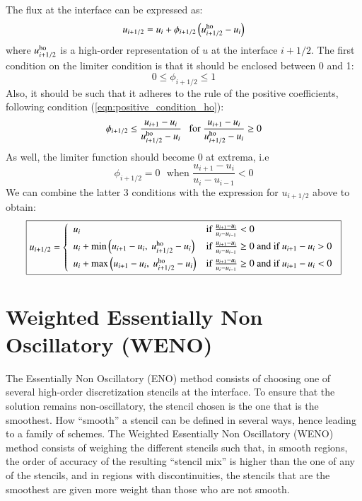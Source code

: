 \documentclass{warpdoc}
\newcommand{\alb}{\vspace{0.1cm}\\} %
\newcommand\frameeqn[1]{\fbox{$\displaystyle #1$}}
\begin{document}
The flux at the interface can be expressed as:
%
\begin{equation}
u_{i+1/2} = u_i +  \phi_{i+1/2} \left( u_{i+1/2}^{\rm ho} - u_i \right)
\end{equation}
% 
where $u_{i+1/2}^{\rm ho}$ is a high-order representation of $u$ at the interface $i+1/2$. 
The first condition on the limiter condition is that it should be enclosed between 0 and 1:
%
\begin{equation}
  0 \le \phi_{i+1/2} \le 1
\end{equation}
%
Also, it should be such that it adheres to the rule of the positive coefficients, following condition (\ref{eqn:positive_condition_ho}):
%
\begin{equation}
 \phi_{i+1/2} \le \frac{u_{i+1} - u_{i}}{u_{i+1/2}^{\rm ho} - u_{i}} ~~~{\rm for~}\frac{u_{i+1} - u_{i}}{u_{i+1/2}^{\rm ho} - u_{i}}\ge 0
\end{equation}
%
As well, the limiter function should become 0 at extrema, i.e
%
\begin{equation}
\phi_{i+1/2}=0 ~~~\textrm{when~}\frac{u_{i+1}-u_i}{u_i-u_{i-1}}<0
\end{equation}
%
We can combine the latter 3 conditions with the expression for $u_{i+1/2}$ above to obtain:
%
\begin{equation}
\frameeqn{
 u_{i+1/2}=\left\{ 
\begin{array}{ll} 
u_i & \textrm{if~}\frac{u_{i+1}-u_i}{u_i-u_{i-1}}<0\alb
u_i+\min\left(u_{i+1}-u_i,~u_{i+1/2}^{\rm ho}-u_i\right) & \textrm{if~}\frac{u_{i+1}-u_i}{u_i-u_{i-1}}\ge 0\textrm{~and~if~}u_{i+1}-u_i>0\alb
u_i+\max\left(u_{i+1}-u_i,~u_{i+1/2}^{\rm ho}-u_i\right) & \textrm{if~}\frac{u_{i+1}-u_i}{u_i-u_{i-1}}\ge 0\textrm{~and~if~}u_{i+1}-u_i<0\\
\end{array}\right.
}
\end{equation}
%














\section{Weighted Essentially Non Oscillatory (WENO)}

The Essentially Non Oscillatory (ENO) method \cite{jcp:1987:harten} consists of choosing one of several high-order discretization stencils at the interface. To ensure that the solution remains non-oscillatory, the stencil chosen is the one that is the smoothest. How ``smooth'' a stencil can be defined in several ways, hence leading to a family of schemes. The Weighted Essentially Non Oscillatory (WENO) method \cite{jcp:1994:liu} consists of weighing the different stencils such that, in smooth regions, the order of accuracy of the resulting ``stencil mix'' is higher than the one of any of the stencils,  and in regions with discontinuities, the stencils that are the smoothest are given more weight than those who are not smooth.
\end{document}
